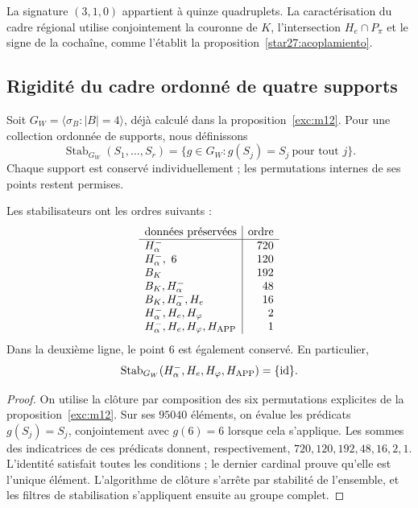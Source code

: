 La signature \((3,1,0)\) appartient à quinze quadruplets. La
caractérisation du cadre régional utilise conjointement la couronne
de \(K\), l'intersection \(H_e\cap P_\pi\) et le signe de la
cochaîne, comme l'établit la proposition~\ref{star27:acoplamiento}.

\subsection{Rigidité du cadre ordonné de quatre supports}
\label{star27:rigidez}

Soit \(G_W=\langle\sigma_B:|B|=4\rangle\), déjà calculé dans la
proposition~\ref{exc:m12}. Pour une collection ordonnée de supports,
nous définissons
\[
\operatorname{Stab}_{G_W}(S_1,\ldots,S_r)
=\{g\in G_W:g(S_j)=S_j\ \text{pour tout }j\}.
\]
Chaque support est conservé individuellement ; les permutations internes
de ses points restent permises.

\begin{theorem}
\label{star27:marco}
Les stabilisateurs ont les ordres suivants :
\[
\begin{array}{l|r}
\text{données préservées}&\text{ordre}\\ \hline
H^-_\alpha&720\\
H^-_\alpha,\ 6&120\\
B_K&192\\
B_K,H^-_\alpha&48\\
B_K,H^-_\alpha,H_e&16\\
H^-_\alpha,H_e,H_\varphi&2\\
H^-_\alpha,H_e,H_\varphi,H_{\rm APP}&1
\end{array}
\]
Dans la deuxième ligne, le point \(6\) est également conservé.
En particulier,
\[
\operatorname{Stab}_{G_W}
(H^-_\alpha,H_e,H_\varphi,H_{\rm APP})=\{\operatorname{id}\}.
\]
\end{theorem}

\begin{proof}
On utilise la clôture par composition des six permutations
explicites de la proposition~\ref{exc:m12}. Sur ses \(95040\)
éléments, on évalue les prédicats \(g(S_j)=S_j\), conjointement avec
\(g(6)=6\) lorsque cela s'applique. Les sommes des indicatrices de
ces prédicats donnent, respectivement,
\(720,120,192,48,16,2,1\). L'identité satisfait toutes les
conditions ; le dernier cardinal prouve qu'elle est l'unique élément.
L'algorithme de clôture s'arrête par stabilité de l'ensemble,
et les filtres de stabilisation s'appliquent ensuite au groupe complet.
\end{proof}

